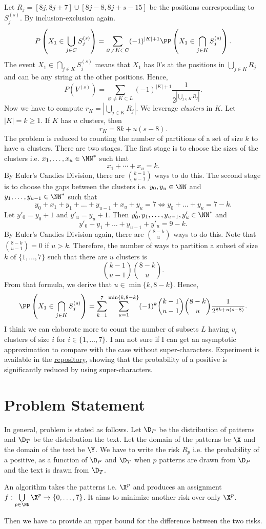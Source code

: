 Let $R_j = [8j, 8j+7] \cup [8j-8, 8j+s-15]$ be the positions corresponding to $S^{(s)}_j$. By inclusion-exclusion again.
$$P\left(X_1\in \bigcup_{j\in C} S^{(s)}_j\right) = \sum\limits_{\varnothing\ne K\subset C}(-1)^{|K|+1} \PP\left(X_1\in \bigcap\limits_{j\in K}S^{(s)}_j\right).$$
The event $X_1\in \bigcap\limits_{j\in K}S^{(s)}_j$ means that $X_1$ has $0$'s at the positions in $\bigcup_{j\in K} R_j$ and can be any string at the other positions. Hence,
$$P(V^{(s)}) = \sum\limits_{\varnothing\ne K\subset L}(-1)^{|K|+1} \dfrac{1}{2^{|\bigcup_{j\in K} R_j|}}.$$
Now we have to compute $r_K=|\bigcup_{j\in K} R_j|$. We leverage \textit{clusters} in $K$. Let $|K|=k\ge 1$. If $K$ has $u$ clusters, then
$$r_K=8k+u(s-8).$$
The problem is reduced to counting the number of partitions of a set of size $k$ to have $u$ clusters. There are two stages. The first stage is to choose the sizes of the clusters i.e. $x_1,\ldots,x_u \in \NN^*$ such that
$$x_1+\cdots+x_u=k.$$
By Euler's Candies Division, there are $\binom{k-1}{u-1}$ ways to do this. The second stage is to choose the gaps between the clusters i.e. $y_0,y_u\in\NN$ and $y_1,\ldots,y_{u-1}\in\NN^*$ such that
$$y_0+x_1+y_1+\ldots+y_{u-1}+x_u+y_u=7 \Leftrightarrow y_0+\ldots+y_u=7-k.$$
Let $y'_0 = y_0+1$ and $y'_u = y_u+1$. Then $y'_0,y_1,\ldots,y_{u-1},y'_u \in \NN^*$ and
$$y'_0+y_1+\ldots+y_{u-1}+y'_u = 9-k.$$
By Euler's Candies Division again, there are $\binom{8-k}{u}$ ways to do this. Note that $\binom{8-k}{u-1}=0$ if $u>k$. Therefore, the number of ways to partition a subset of size $k$ of $\{1,\ldots, 7\}$ such that there are $u$ clusters is
$$\binom{k-1}{u-1}\binom{8-k}{u}.$$
From that formula, we derive that $u\in\min\{k,8-k\}$. Hence,
$$\PP\left(X_1\in \bigcap\limits_{j\in K}S^{(s)}_j\right) = \sum\limits_{k=1}^7 \sum\limits_{u=1}^{\min\{k,8-k\}}(-1)^k \binom{k-1}{u-1}\binom{8-k}{u}\dfrac{1}{2^{8k+u(s-8)}}.$$
I think we can elaborate more to count the number of subsets $L$ having $v_i$ clusters of size $i$ for $i\in\{1,\ldots, 7\}$. I am not sure if I can get an asymptotic approximation to compare with the case without super-characters. Experiment is available in the \href{https://github.com/mintcd/string-matchers/blob/main/src/py_fdr/experiments/compare_supercharacter.ipynb}{repository}, showing that the probability of a positive is significantly reduced by using super-characters.


\section{Problem Statement}

In general, problem is stated as follows. Let $\D_{P}$ be the distribution of patterns and $\D_T$ be the distribution the text. Let the domain of the patterns be $\X$ and the domain of the text be $\Y$. We have to write the risk $R_p$ i.e. the probability of a positive, as a function of $\D_P$ and $\D_T$ when $p$ patterns are drawn from $\D_P$ and the text is drawn from $\D_T$.

An algorithm takes the patterns i.e. $\X^p$ and produces an assignment $f:\bigcup\limits_{p\in \NN} \X^p \to \{0,\ldots, 7\}$. It aims to minimize another risk over only $\X^p$.

Then we have to provide an upper bound for the difference between the two risks.
